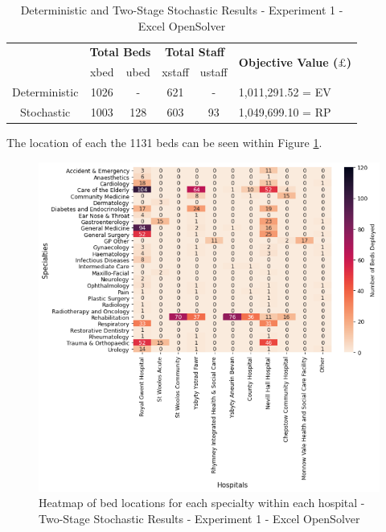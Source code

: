 \documentclass[../thesis.tex]{subfiles}
\begin{document}
\begin{table}[h!]
    \centering
    \begin{tabular}{cccccl}\toprule
 & \multicolumn{2}{l}{\textbf{Total Beds}} & \multicolumn{2}{c}{\textbf{Total Staff}} & \multirow{2}{*}{\textbf{Objective Value ($\pounds$)}}\\ \cmidrule(lr){2-3} \cmidrule(lr){4-5}
 & xbed           & ubed          & xstaff         & ustaff         \\ \midrule
      Deterministic & 1026 & - &  621 & - & 1,011,291.52 =  EV \\ \midrule
      Stochastic & 1003 & 128  & 603 & 93 & 1,049,699.10 = RP\\ \bottomrule
    \end{tabular}
    \caption{Deterministic and Two-Stage Stochastic Results - Experiment 1 - Excel OpenSolver}
    \label{tab:dettwostageresults1}
\end{table}

The location of each the 1131 beds can be seen within Figure \ref{fig:stocHeatmap1}.

\begin{figure}[h!]
    \centering
    \includegraphics{Chapters/Chapter5/Figures/exsto.png}
    \caption{Heatmap of bed locations for each specialty within each hospital - Two-Stage Stochastic Results - Experiment 1 - Excel OpenSolver}
    \label{fig:stocHeatmap1}
\end{figure}
\end{document}
